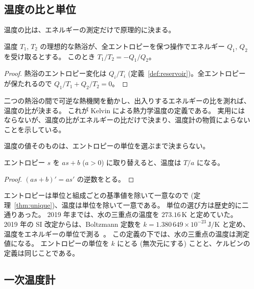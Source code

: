 \subsection{温度の比と単位}

温度の比は、エネルギーの測定だけで原理的に決まる。

\begin{theorem}
  \label{thm:kelvin-ratio}
  \leanok
  温度 $T_1$, $T_2$ の理想的な熱浴が、全エントロピーを保つ操作でエネルギー $Q_1$, $Q_2$ を受け取るとする。
  このとき $T_1 / T_2 = -Q_1 / Q_2$。
\end{theorem}

\begin{proof}
  \leanok
  熱浴のエントロピー変化は $Q_i / T_i$ (定義~\ref{def:reservoir})。全エントロピーが保たれるので $Q_1/T_1 + Q_2/T_2 = 0$。
\end{proof}

二つの熱浴の間で可逆な熱機関を動かし、出入りするエネルギーの比を測れば、温度の比が決まる。
これが Kelvin による熱力学温度の定義である。
実用にはならないが、温度の比がエネルギーの比だけで決まり、温度計の物質によらないことを示している。

温度の値そのものは、エントロピーの単位を選ぶまで決まらない。

\begin{theorem}[温度の単位はエントロピーの単位]
  \label{thm:temperature-unit}
  \leanok
  エントロピー $s$ を $a s + b$ ($a > 0$) に取り替えると、温度は $T/a$ になる。
\end{theorem}

\begin{proof}
  \leanok
  $(as + b)' = a s'$ の逆数をとる。
\end{proof}

エントロピーは単位と組成ごとの基準値を除いて一意なので (定理~\ref{thm:unique})、温度は単位を除いて一意である。
単位の選び方は歴史的に二通りあった。
2019 年までは、水の三重点の温度を $273.16\,\mathrm{K}$ と定めていた。
2019 年の SI 改定からは、Boltzmann 定数を $k = 1.380\,649 \times 10^{-23}\,\mathrm{J/K}$ と定め、温度をエネルギーの単位で測る~\cite{SI2019}。
この定義の下では、水の三重点の温度は測定値になる。
エントロピーの単位を $k$ にとる (無次元にする) ことと、ケルビンの定義は同じことである。

\subsection{一次温度計}

